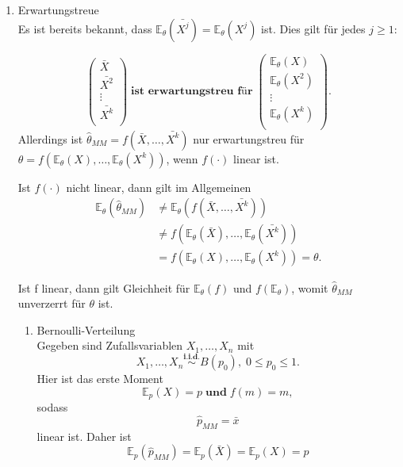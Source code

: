 \documentclass[10pt]{article}
\newcommand{\FZV}{X_1, \ldots, X_n} %
\newcommand{\EW}{\mathbb{E}} %
\newenvironment{BSP}[1][]
{\begin{Beispiel}[frametitle=#1]}{\end{Beispiel}}
\begin{document}
\begin{enumerate}
	\item Erwartungstreue\\
	Es ist bereits bekannt, dass $\EW_\theta(\bar{X^j})=\EW_\theta(X^j)$ ist. Dies gilt für jedes $j \geq 1$:
	
	\begin{equation*}
		\left(
		\begin{array}{c}
			\bar{X}\\
			\bar{X^2}\\
			\vdots\\
			\bar{X^k}\\
		\end{array}
		\right)\; \textbf{ist erwartungstreu für} \;
		\left(
		\begin{array}{c}
		 \EW_\theta(X)\\
		 \EW_\theta(X^2)\\
			\vdots\\
		 \EW_\theta(X^k) \\
		\end{array}
		\right).
	\end{equation*}
	 Allerdings ist $\hat{\theta}_{MM} = f(\bar{X}, \ldots, \bar{X^k})$ nur erwartungstreu für $\theta = f(\EW_\theta(X), \ldots, \EW_\theta(X^k))$, wenn $f(\cdot)$ linear ist. 
	 
	 Ist $f(\cdot)$ nicht linear, dann gilt im Allgemeinen
	 \begin{equation*}
	 	\begin{split}
	 	\EW_\theta(\hat{\theta}_{MM}) &\neq \EW_\theta(f(\bar{X}, \ldots, \bar{X^k}))\\
	 	&\neq f(\EW_\theta(\bar{X}),\ldots, \EW_\theta(\bar{X^k}))\\
	 	&= f(\EW_\theta({X}),\ldots, \EW_\theta({X^k})) =  \theta.
	 \end{split}
	 \end{equation*}
	
	Ist f linear, dann gilt Gleichheit für $\EW_{\theta}(f)$ und $f(\EW_{\theta})$, womit $\hat{\theta}_{MM}$ unverzerrt für $\theta$ ist.\\
	
	\begin{BSP}[Beispiel 1.3.3 (Erwartungstreue)]
			\begin{enumerate}[label = (\roman*)]
			\item Bernoulli-Verteilung\\
			Gegeben sind Zufallsvariablen $\FZV$ mit
			\begin{equation*}
				\FZV \overset{\textbf{i.i.d.}}{\sim} B(p_0), \; 0 \leq p_0 \leq 1.
			\end{equation*} 
			Hier ist das erste Moment
			\begin{equation*}
				\EW_p(X)=p \; \textbf{und} \; 	f(m)=m,
			\end{equation*}
			sodass
			\begin{equation*}
				\hat{p}_{MM} = \bar{x} 
			\end{equation*}
			linear ist. Daher ist 
			\begin{equation*}
				\EW_p(\hat{p}_{MM}) = \EW_p(\bar{X}) = \EW_p(X) = p
			\end{equation*}
			

\end{enumerate}
\end{BSP}
\end{enumerate}
\end{document}
